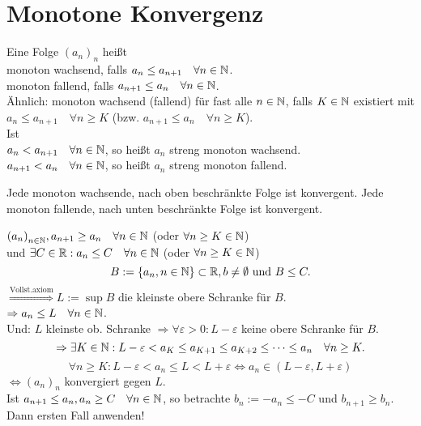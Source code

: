 \documentclass[../ana1.tex]{subfiles}
\begin{document}
\setcounter{section}{7}

\section{Monotone Konvergenz}
\begin{defi}
	Eine Folge \({(a_n)}_n\) heißt \\
	monoton wachsend, falls \(a_n\leq a_{n+1} \quad \forall n\in\mathbb{N} \).\\
	monoton fallend, falls \(a_{n+1} \leq a_n \quad\forall n\in\mathbb{N} \).\\
	Ähnlich: monoton wachsend (fallend) für fast alle \(n\in\mathbb{N} \), falls \( K\in\mathbb{N} \) existiert mit \( a_n\leq a_{n+1} \quad \forall n\geq K \) (bzw. \(a_{n+1}\leq a_n \quad \forall n\geq K \)).\\
	Ist \\
	\( a_n<a_{n+1} \quad \forall n\in\mathbb{N} \), so heißt \(a_n\) streng monoton wachsend.\\
	\( a_{n+1}<a_n \quad \forall n\in\mathbb{N} \), so heißt \(a_n\) streng monoton fallend.
\end{defi}
\begin{satz}
	Jede monoton wachsende, nach oben beschränkte Folge ist konvergent. Jede monoton fallende, nach unten beschränkte Folge ist konvergent.
\end{satz}
\begin{bew}
	\({(a_n)}_{n\in\mathbb{N}}, a_{n+1} \geq a_n \quad \forall n\in\mathbb{N} \) (oder \( \forall n\geq K \in\mathbb{N} \))\\
	und \( \exists C\in\mathbb{R}: a_n \leq C \quad \forall n\in\mathbb{N} \) (oder \( \forall n\geq K \in\mathbb{N} \))\\
	\[ B:= \{a_n, n\in\mathbb{N} \} \subset \mathbb{R}, b\neq \emptyset \text{ und } B\leq C. \]
	\(\overset{\text{Vollst.axiom}}{\Rightarrow} L := \sup B\) die kleinste obere Schranke für \(B\).\\
	\(\Rightarrow a_n \leq L \quad \forall n\in\mathbb{N} \).\\
	Und: \(L\) kleinste ob. Schranke \( \Rightarrow \forall \varepsilon>0: L-\varepsilon \) keine obere Schranke für \(B\).\\
	\[ \Rightarrow \exists K \in\mathbb{N}: L-\varepsilon < a_K \leq a_{K+1} \leq a_{K+2} \leq \cdots \leq a_n \quad \forall n\geq K. \]
	\[ \forall n\geq K: L-\varepsilon < a_n \leq L < L + \varepsilon \Leftrightarrow a_n \in (L-\varepsilon, L + \varepsilon) \]
	\( \Leftrightarrow {(a_n)}_n \) konvergiert gegen \(L\).\\
	Ist \(a_{n+1} \leq a_n, a_n\geq C \quad \forall n\in\mathbb{N} \), so betrachte \(b_n := -a_n \leq -C \) und \(b_{n+1} \geq b_n\). Dann ersten Fall anwenden!
\end{bew}
\end{document}
